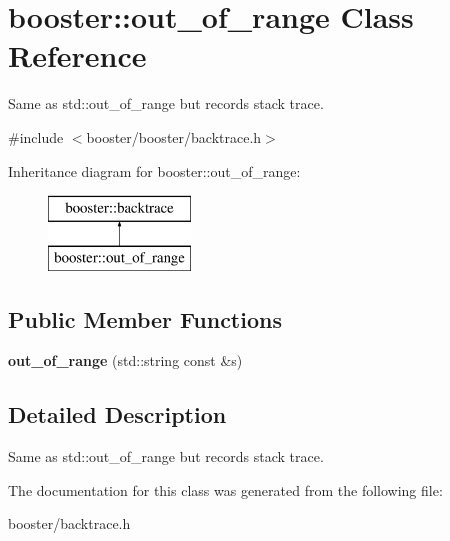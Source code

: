 \section{booster\-:\-:out\-\_\-of\-\_\-range \-Class \-Reference}
\label{classbooster_1_1out__of__range}


\-Same as std\-::out\-\_\-of\-\_\-range but records stack trace.  




{\ttfamily \#include $<$booster/booster/backtrace.\-h$>$}

\-Inheritance diagram for booster\-:\-:out\-\_\-of\-\_\-range\-:\begin{figure}[H]
\begin{center}
\leavevmode
\includegraphics[height=2.000000cm]{classbooster_1_1out__of__range}
\end{center}
\end{figure}
\subsection*{\-Public \-Member \-Functions}
\begin{DoxyCompactItemize}
\item 
{\bfseries out\-\_\-of\-\_\-range} (std\-::string const \&s)\label{classbooster_1_1out__of__range_a8682d7da97d49768d8c0b3bd5338c4cc}

\end{DoxyCompactItemize}


\subsection{\-Detailed \-Description}
\-Same as std\-::out\-\_\-of\-\_\-range but records stack trace. 

\-The documentation for this class was generated from the following file\-:\begin{DoxyCompactItemize}
\item 
booster/backtrace.\-h\end{DoxyCompactItemize}
